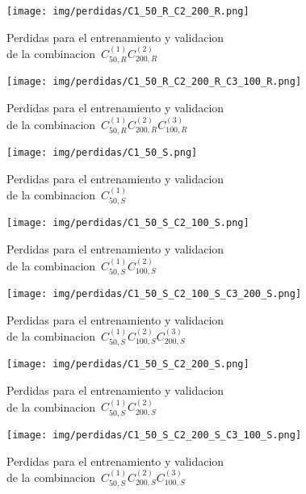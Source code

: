 \begin{figure}[H]
    \centerline{\texttt{[image: img/perdidas/C1\_50\_R\_C2\_200\_R.png]}}
    \caption{Perdidas para el entrenamiento y validacion\\ de la combinacion~$C^{(1)}_{50,R}C^{(2)}_{200,R}$}
    \label{fig:C1_50_R_C2_200_R}
\end{figure}

\begin{figure}[H]
    \centerline{\texttt{[image: img/perdidas/C1\_50\_R\_C2\_200\_R\_C3\_100\_R.png]}}
    \caption{Perdidas para el entrenamiento y validacion\\ de la combinacion~$C^{(1)}_{50,R}C^{(2)}_{200,R}C^{(3)}_{100,R}$}
    \label{fig:C1_50_R_C2_200_R_C3_100_R}
\end{figure}

\begin{figure}[H]
    \centerline{\texttt{[image: img/perdidas/C1\_50\_S.png]}}
    \caption{Perdidas para el entrenamiento y validacion\\ de la combinacion~$C^{(1)}_{50,S}$}
    \label{fig:C1_50_S}
\end{figure}

\begin{figure}[H]
    \centerline{\texttt{[image: img/perdidas/C1\_50\_S\_C2\_100\_S.png]}}
    \caption{Perdidas para el entrenamiento y validacion\\ de la combinacion~$C^{(1)}_{50,S}C^{(2)}_{100,S}$}
    \label{fig:C1_50_S_C2_100_S}
\end{figure}

\begin{figure}[H]
    \centerline{\texttt{[image: img/perdidas/C1\_50\_S\_C2\_100\_S\_C3\_200\_S.png]}}
    \caption{Perdidas para el entrenamiento y validacion\\ de la combinacion~$C^{(1)}_{50,S}C^{(2)}_{100,S}C^{(3)}_{200,S}$}
    \label{fig:C1_50_S_C2_100_S_C3_200_S}
\end{figure}

\begin{figure}[H]
    \centerline{\texttt{[image: img/perdidas/C1\_50\_S\_C2\_200\_S.png]}}
    \caption{Perdidas para el entrenamiento y validacion\\ de la combinacion~$C^{(1)}_{50,S}C^{(2)}_{200,S}$}
    \label{fig:C1_50_S_C2_200_S}
\end{figure}

\begin{figure}[H]
    \centerline{\texttt{[image: img/perdidas/C1\_50\_S\_C2\_200\_S\_C3\_100\_S.png]}}
    \caption{Perdidas para el entrenamiento y validacion\\ de la combinacion~$C^{(1)}_{50,S}C^{(2)}_{200,S}C^{(3)}_{100,S}$}
    \label{fig:C1_50_S_C2_200_S_C3_100_S}
\end{figure}

